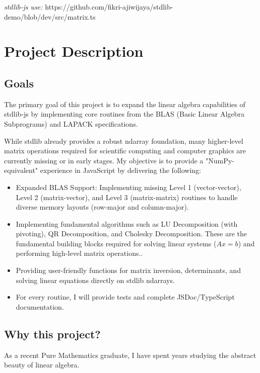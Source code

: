 \documentclass[
	a4paper,
	12pt
]{article}
\begin{document}
\textit{stdlib-js use:} https://github.com/fikri-ajiwijaya/stdlib-demo/blob/dev/src/matrix.ts

\section{Project Description}

\subsection{Goals}

The primary goal of this project is to expand the linear algebra capabilities of stdlib-js by implementing core routines from the BLAS (Basic Linear Algebra Subprograms) and LAPACK specifications.

While stdlib already provides a robust ndarray foundation, many higher-level matrix operations required for scientific computing and computer graphics are currently missing or in early stages. My objective is to provide a "NumPy-equivalent" experience in JavaScript by delivering the following:

\begin{itemize}
	\item Expanded BLAS Support: Implementing missing Level 1 (vector-vector), Level 2 (matrix-vector), and Level 3 (matrix-matrix) routines to handle diverse memory layouts (row-major and column-major).

	\item Implementing fundamental algorithms such as LU Decomposition (with pivoting), QR Decomposition, and Cholesky Decomposition. These are the fundamental building blocks required for solving linear systems (\(Ax = b\)) and performing high-level matrix operations..

	\item Providing user-friendly functions for matrix inversion, determinants, and solving linear equations directly on stdlib ndarrays.

	\item For every routine, I will provide tests and complete JSDoc/TypeScript documentation.
\end{itemize}

\subsection{Why this project?}

As a recent Pure Mathematics graduate, I have spent years studying the abstract beauty of linear algebra.
\end{document}
